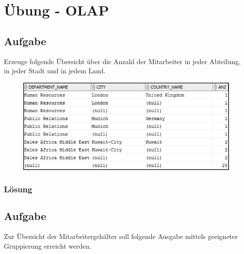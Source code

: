 \section{Übung - OLAP}
\label{sec:uebung_06}

\subsection{Aufgabe}
\label{subsec:uebung_06.aufgabe_01}
Erzeuge folgende Übersicht über die Anzahl der Mitarbeiter in jeder Abteilung, in jeder Stadt und in jedem Land.

\begin{figure}[H]
  \centering
  \includegraphics[width=1\textwidth]{img//uebung_06_-_aufgabe_01.png}
  \label{img:uebung_06_-_aufgabe_01}
\end{figure}

\subsubsection*{Lösung}
\label{subsubsec:uebung_06.aufgabe_01.loesung}


\subsection{Aufgabe}
\label{subsec:uebung_06.aufgabe_02}
Zur Übersicht der Mitarbeitergehälter soll folgende Ausgabe mittels geeigneter Gruppierung erreicht werden.


